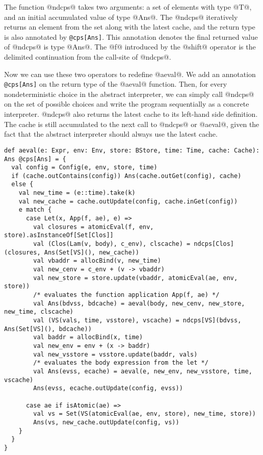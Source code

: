 \documentclass[acmsmall]{acmart}\settopmatter{}
\begin{document}
The function @ndcps@ takes two arguments: a set of elements with type @T@, 
and an initial accumulated value of type @Ans@.
The @ndcps@ iteratively returns an element from the set along with the latest cache, 
and the return type is also annotated by \verb|@cps[Ans]|. 
This annotation denotes the final returned value of @ndcps@ is type @Ans@.
The @f@ introduced by the @shift@ operator is the delimited continuation from the 
call-site of @ndcps@.

Now we can use these two operators to redefine @aeval@.
We add an annotation \verb|@cps[Ans]| on the return type of the @aeval@ function.
Then, for every nondeterministic choice in the abstract interpreter, we can simply call 
@ndcps@ on the set of possible choices and write the program sequentially as a concrete 
interpreter. @ndcps@ also returns the latest cache to its left-hand side definition.
The cache is still accumulated to the next call to @ndcps@ or @aeval@, 
given the fact that the abstract interpreter should always use the latest cache.

\begin{lstlisting}
def aeval(e: Expr, env: Env, store: BStore, time: Time, cache: Cache): Ans @cps[Ans] = {
  val config = Config(e, env, store, time)
  if (cache.outContains(config)) Ans(cache.outGet(config), cache)
  else {
    val new_time = (e::time).take(k)
    val new_cache = cache.outUpdate(config, cache.inGet(config))
    e match {
      case Let(x, App(f, ae), e) =>
        val closures = atomicEval(f, env, store).asInstanceOf[Set[Clos]]
        val (Clos(Lam(v, body), c_env), clscache) = ndcps[Clos](closures, Ans(Set[VS](), new_cache))
        val vbaddr = allocBind(v, new_time)
        val new_cenv = c_env + (v -> vbaddr)
        val new_store = store.update(vbaddr, atomicEval(ae, env, store))
        /* evaluates the function application App(f, ae) */
        val Ans(bdvss, bdcache) = aeval(body, new_cenv, new_store, new_time, clscache)
        val (VS(vals, time, vsstore), vscache) = ndcps[VS](bdvss, Ans(Set[VS](), bdcache))
        val baddr = allocBind(x, time)
        val new_env = env + (x -> baddr)
        val new_vsstore = vsstore.update(baddr, vals)
        /* evaluates the body expression from the let */
        val Ans(evss, ecache) = aeval(e, new_env, new_vsstore, time, vscache)
        Ans(evss, ecache.outUpdate(config, evss))

      case ae if isAtomic(ae) =>
        val vs = Set(VS(atomicEval(ae, env, store), new_time, store))
        Ans(vs, new_cache.outUpdate(config, vs))
    }
  }
}
\end{lstlisting}
\end{document}
